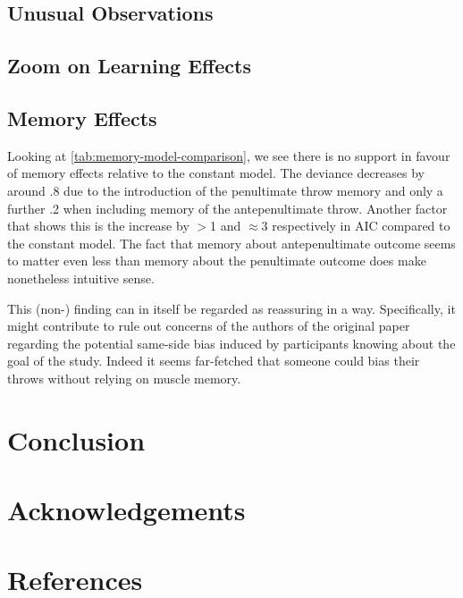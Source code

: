 \documentclass[a4paper, 12pt,oneside]{article}
\begin{document}
		\subsection{Unusual Observations}

		\subsection{Zoom on Learning Effects}\label{sec:disc-learning-effects}
		\subsection{Memory Effects}
		Looking at \ref{tab:memory-model-comparison}, we see there is no support in favour of memory effects relative to the constant model. The deviance decreases by around .8 due to the introduction of the penultimate throw memory and only a further .2 when including memory of the antepenultimate throw. Another factor that shows this is the increase by $>$1 and $\approx 3$ respectively in AIC compared to the constant model.
		The fact that memory about antepenultimate outcome seems to matter even less than memory about the penultimate outcome does make nonetheless intuitive sense. 

		This (non-) finding can in itself be regarded as reassuring in a way. Specifically, it might contribute to rule out concerns of the authors of the original paper regarding the potential same-side bias induced by participants knowing about the goal of the study. Indeed it seems far-fetched that someone could bias their throws without relying on muscle memory. 
	\section{Conclusion}
	\section*{Acknowledgements}
	\section*{References}
\end{document}
